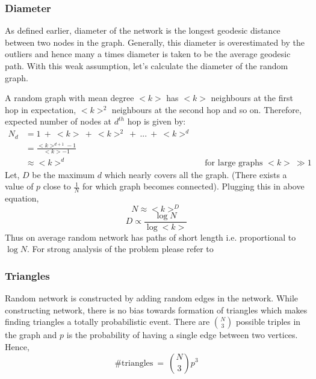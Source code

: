 \documentclass[12pt]{article}
\begin{document}
\subsubsection{Diameter}
\par As defined earlier, diameter of the network is the longest geodesic distance between two nodes in the graph. Generally, this diameter is overestimated by the outliers and hence many a times diameter is taken to be the average geodesic path. With this weak assumption, let's calculate the diameter of the random graph.
\par A random graph with mean degree $<k>$ has $<k>$ neighbours at the first hop in expectation, $<k>^2$ neighbours at the second hop and so on. Therefore, expected number of nodes at $d^{th}$ hop is given by:
\begin{align*}
N_d &= 1 ~+~ <k> ~+~ <k>^2 ~+~ ... ~+~ <k>^d \\
	&= \frac {<k>^{d + 1} - 1} {<k> - 1} \\
	&\approx <k>^d	&& \text{for large graphs $<k> ~\gg 1$}
\end{align*}
Let, $D$ be the maximum $d$ which nearly covers all the graph. (There exists a value of $p$ close to $\frac{1}{N}$ for which graph becomes connected). Plugging this in above equation,
\[
N \approx <k>^{D}
\]
\begin{equation}
D \propto \frac {\log N} {\log <k>}
\end{equation}
Thus on average random network has paths of short length i.e. proportional to $\log N$. For strong analysis of the problem please refer to \cite{chung_diameter}

\subsubsection{Triangles}
Random network is constructed by adding random edges in the network. While constructing network, there is no bias towards formation of triangles which makes finding triangles a totally probabilistic event. There are $N \choose 3$ possible triples in the graph and $p$ is the probability of having a single edge between two vertices. Hence,
\begin{equation}
\#\text{triangles} ~=~ {N \choose 3}p^3
\end{equation}
\end{document}
